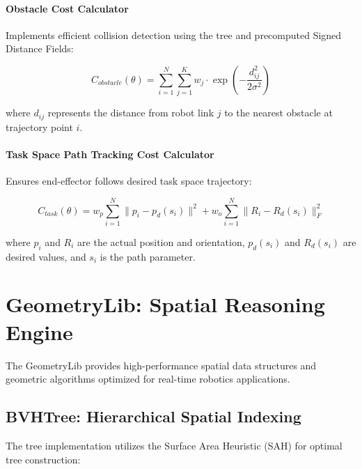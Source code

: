 \paragraph{Obstacle Cost Calculator}
Implements efficient collision detection using the \bvh{} tree and precomputed Signed Distance Fields:

\begin{equation}
C_{obstacle}(\theta) = \sum_{i=1}^{N} \sum_{j=1}^{K} w_j \cdot \exp\left(-\frac{d_{ij}^2}{2\sigma^2}\right)
\end{equation}

where $d_{ij}$ represents the distance from robot link $j$ to the nearest obstacle at trajectory point $i$.

\paragraph{Task Space Path Tracking Cost Calculator}
Ensures end-effector follows desired task space trajectory:

\begin{equation}
C_{task}(\theta) = w_p \sum_{i=1}^{N} \|p_i - p_d(s_i)\|^2 + w_o \sum_{i=1}^{N} \|R_i - R_d(s_i)\|_F^2
\end{equation}

where $p_i$ and $R_i$ are the actual position and orientation, $p_d(s_i)$ and $R_d(s_i)$ are desired values, and $s_i$ is the path parameter.

\section{GeometryLib: Spatial Reasoning Engine}
\label{sec:geometrylib_analysis}

The GeometryLib provides high-performance spatial data structures and geometric algorithms optimized for real-time robotics applications.

\subsection{BVHTree: Hierarchical Spatial Indexing}

The \bvh{} tree implementation utilizes the Surface Area Heuristic (SAH) for optimal tree construction:

